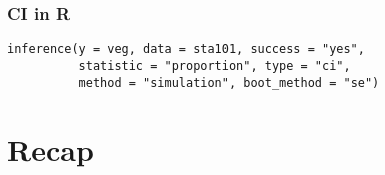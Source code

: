 \documentclass[slidestop,compress,mathserif,12pt,t,professionalfonts,xcolor=table]{beamer}
\begin{document}

\begin{frame}[fragile]
\frametitle{CI in R}

{\footnotesize
\begin{verbatim}
inference(y = veg, data = sta101, success = "yes", 
          statistic = "proportion", type = "ci", 
          method = "simulation", boot_method = "se")
\end{verbatim}
}

\end{frame}


\section{Recap}

\end{document}

